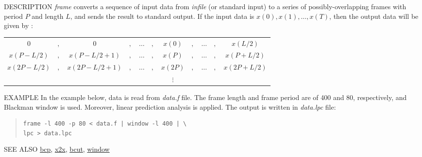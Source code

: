 \begin{synopsis}
 \item [frame] [ --l $L$ ] [ --p $P$ ] [ --n ] [ {\em infile} ]
\end{synopsis}

\begin{qsection}{DESCRIPTION}
{\em frame} converts a sequence of input data 
from {\em infile} (or standard input) 
to a series of possibly-overlapping frames with period $P$ and length $L$, 
and sends the result to standard output.
If the input data is $x(0),x(1),\ldots,x(T)$, then the output data
 will be given by :
\begin{center}
\begin{tabular}{ccccccccccc}
$0$&$,$&$0$&$,$&$\ldots$&$,$&$x(0)$&$,$&$\ldots$&$,$&$x(L/2)$\\
$x(P-L/2)$&$,$&$x(P-L/2+1)$&$,$&$\ldots$&$,$&$x(P)$&$,$&$\ldots$&$,$&$x(P+L/2)$\\
$x(2P-L/2)$&$,$&$x(2P-L/2+1)$&$,$&$\ldots$&$,$&$x(2P)$&$,$&$\ldots$&$,$&$x(2P+L/2)$\\
&&&&&&$\vdots$&&&&
\end{tabular}
\end{center}

\end{qsection}

\begin{options}
\end{options}


\begin{qsection}{EXAMPLE}
In the example below, data is read from {\em data.f} file.  The frame length and
frame period are of 400 and 80, respectively, and Blackman window is used. Moreover,
linear prediction analysis is applied. The output is written in {\em data.lpc} file:
\begin{quote}
 \verb!frame -l 400 -p 80 < data.f | window -l 400 | \!\\
 \verb!lpc > data.lpc!
\end{quote}
\end{qsection}

\begin{qsection}{SEE ALSO}
\hyperlink{bcp}{bcp},
\hyperlink{x2x}{x2x},
\hyperlink{bcut}{bcut},
\hyperlink{window}{window}
\end{qsection}
